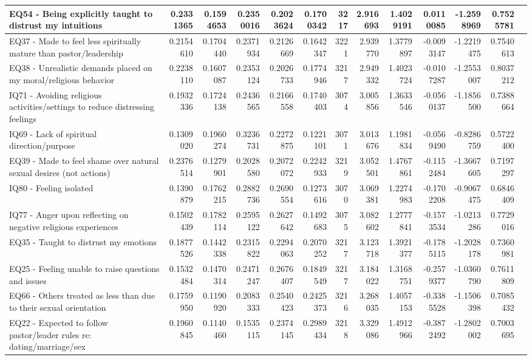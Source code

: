 \documentclass[
  letterpaper,
]{article}
\begin{document}
\begin{table}
\begin{tabular}{l|r|r|r|r|r|r|r|r|r|r|r|l}
\hline
EQ54 - Being explicitly taught to distrust my intuitions & 0.2331365 & 0.1594653 & 0.2350016 & 0.2023624 & 0.1700342 & 3217 & 2.916693 & 1.4029191 & 0.0110085 & -1.2598969 & 0.7525781 & \\
\hline
EQ37 - Made to feel less spiritually mature than pastor/leadership & 0.2154610 & 0.1704440 & 0.2371934 & 0.2126669 & 0.1642347 & 3221 & 2.939770 & 1.3779897 & -0.0093147 & -1.2219475 & 0.7540613 & \\
\hline
EQ38 - Unrealistic demands placed on my moral/religious behavior & 0.2238110 & 0.1607087 & 0.2353124 & 0.2026733 & 0.1774946 & 3217 & 2.949332 & 1.4023724 & -0.0107287 & -1.2553007 & 0.8037212 & \\
\hline
IQ71 - Avoiding religious activities/settings to reduce distressing feelings & 0.1932336 & 0.1724138 & 0.2436565 & 0.2166558 & 0.1740403 & 3074 & 3.005856 & 1.3633546 & -0.0560137 & -1.1856500 & 0.7388664 & \\
\hline
IQ69 - Lack of spiritual direction/purpose & 0.1309020 & 0.1960274 & 0.3236731 & 0.2272875 & 0.1221101 & 3071 & 3.013676 & 1.1981834 & -0.0569490 & -0.8286759 & 0.5722400 & \\
\hline
EQ39 - Made to feel shame over natural sexual desires (not actions) & 0.2376514 & 0.1279901 & 0.2028580 & 0.2072072 & 0.2242933 & 3219 & 3.052501 & 1.4767861 & -0.1152484 & -1.3667605 & 0.7197297 & \\
\hline
IQ80 - Feeling isolated & 0.1390879 & 0.1762215 & 0.2882736 & 0.2690554 & 0.1273616 & 3070 & 3.069381 & 1.2274983 & -0.1702208 & -0.9067475 & 0.6846409 & \\
\hline
IQ77 - Anger upon reflecting on negative religious experiences & 0.1502439 & 0.1782114 & 0.2595122 & 0.2627642 & 0.1492683 & 3075 & 3.082602 & 1.2777841 & -0.1573534 & -1.0213286 & 0.7729016 & \\
\hline
EQ35 - Taught to distrust my emotions & 0.1877526 & 0.1442338 & 0.2315822 & 0.2294063 & 0.2070252 & 3217 & 3.123718 & 1.3921377 & -0.1785115 & -1.2028178 & 0.7360981 & \\
\hline
EQ25 - Feeling unable to raise questions and issues & 0.1532484 & 0.1470314 & 0.2471247 & 0.2676407 & 0.1849549 & 3217 & 3.184022 & 1.3168751 & -0.2579377 & -1.0360790 & 0.7611809 & \\
\hline
EQ66 - Others treated as less than due to their sexual orientation & 0.1759950 & 0.1190920 & 0.2083333 & 0.2540423 & 0.2425373 & 3216 & 3.268035 & 1.4057153 & -0.3385528 & -1.1506398 & 0.7085432 & \\
\hline
EQ22 - Expected to follow pastor/leader rules re: dating/marriage/sex & 0.1960845 & 0.1140460 & 0.1535115 & 0.2374145 & 0.2989434 & 3218 & 3.329086 & 1.4912966 & -0.3872492 & -1.2802002 & 0.7003695 & \\
\hline
\end{tabular}
\end{table}
\end{document}
